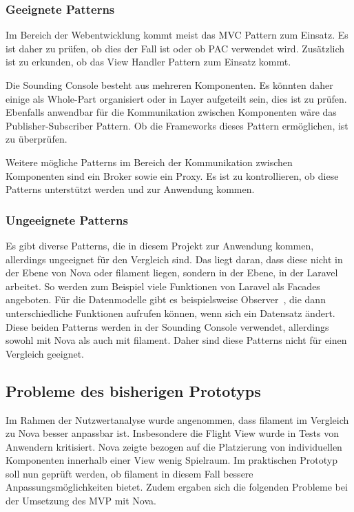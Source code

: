 \newpage

\subsubsection{Geeignete Patterns}
Im Bereich der Webentwicklung kommt meist das MVC Pattern zum Einsatz.
Es ist daher zu prüfen, ob dies der Fall ist oder ob PAC verwendet wird.
Zusätzlich ist zu erkunden, ob das View Handler Pattern zum Einsatz kommt.

Die Sounding Console besteht aus mehreren Komponenten.
Es könnten daher einige als Whole-Part organisiert oder in Layer aufgeteilt sein, dies ist zu prüfen.
Ebenfalls anwendbar für die Kommunikation zwischen Komponenten wäre das Publisher-Subscriber Pattern.
Ob die Frameworks dieses Pattern ermöglichen, ist zu überprüfen.

Weitere mögliche Patterns im Bereich der Kommunikation zwischen Komponenten sind ein Broker sowie ein Proxy.
Es ist zu kontrollieren, ob diese Patterns unterstützt werden und zur Anwendung kommen.

\subsubsection{Ungeeignete Patterns}
Es gibt diverse Patterns, die in diesem Projekt zur Anwendung kommen, allerdings ungeeignet für den Vergleich sind.
Das liegt daran, dass diese nicht in der Ebene von Nova oder filament liegen, sondern in der Ebene, in der Laravel arbeitet.
So werden zum Beispiel viele Funktionen von Laravel als Facades~\cite{gamma-design-patterns} angeboten.
Für die Datenmodelle gibt es beispielsweise Observer~\cite{gamma-design-patterns}, die dann unterschiedliche Funktionen aufrufen können, wenn sich ein Datensatz ändert.
Diese beiden Patterns werden in der Sounding Console verwendet, allerdings sowohl mit Nova als auch mit filament.
Daher sind diese Patterns nicht für einen Vergleich geeignet.

\newpage

\subsection{Probleme des bisherigen Prototyps}
Im Rahmen der Nutzwertanalyse wurde angenommen, dass filament im Vergleich zu Nova besser anpassbar ist.
Insbesondere die Flight View wurde in Tests von Anwendern kritisiert.
Nova zeigte bezogen auf die Platzierung von individuellen Komponenten innerhalb einer View wenig Spielraum.
Im praktischen Prototyp soll nun geprüft werden, ob filament in diesem Fall bessere Anpassungsmöglichkeiten bietet.
Zudem ergaben sich die folgenden Probleme bei der Umsetzung des MVP mit Nova.

